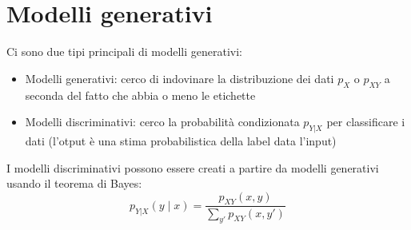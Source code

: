 \section{Modelli generativi}
Ci sono due tipi principali di modelli generativi:
\begin{itemize}
	\item Modelli generativi: cerco di indovinare la distribuzione dei dati $ p_X $ o $ p_{XY} $ a seconda del fatto che abbia o meno le etichette
	\item Modelli discriminativi: cerco la probabilità condizionata $ p_{Y|X} $ per classificare i dati (l'otput è una stima probabilistica della label data l'input)
\end{itemize}
I modelli discriminativi possono essere creati a partire da modelli generativi usando il teorema di Bayes:
\[
	p_{Y|X}(y \mid x) = \frac{p_{XY}(x, y)}{\sum_{y'} p_{XY}(x, y')}
\]
